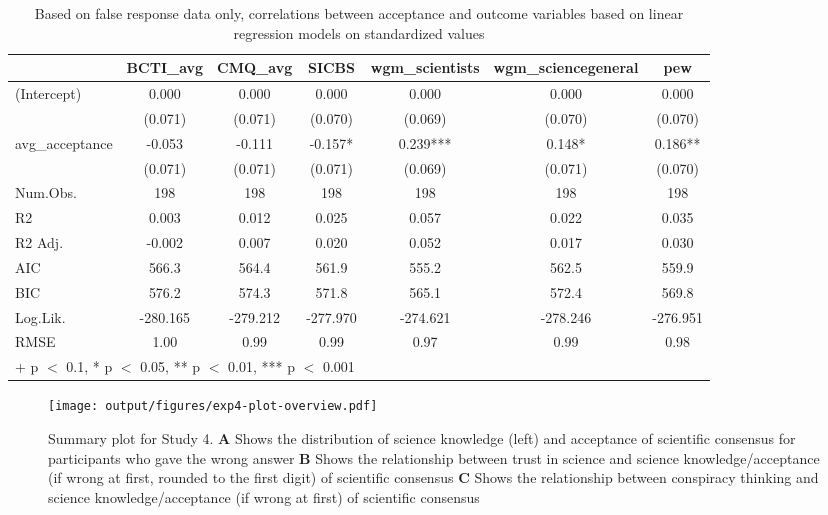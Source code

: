 \documentclass[
  doc,floatsintext]{apa6}
\begin{document}
\begin{table}

\caption{\label{tab:exp4-false-response-regression}Based on false response data only, correlations between acceptance and outcome variables based on linear regression models on standardized values}
\centering
\begin{tabular}[t]{lcccccc}
\toprule
  & BCTI\_avg & CMQ\_avg & SICBS & wgm\_scientists & wgm\_sciencegeneral & pew\\
\midrule
(Intercept) & 0.000 & 0.000 & 0.000 & 0.000 & 0.000 & 0.000\\
 & (0.071) & (0.071) & (0.070) & (0.069) & (0.070) & (0.070)\\
avg\_acceptance & -0.053 & -0.111 & -0.157* & 0.239*** & 0.148* & 0.186**\\
 & (0.071) & (0.071) & (0.071) & (0.069) & (0.071) & (0.070)\\
\midrule
Num.Obs. & 198 & 198 & 198 & 198 & 198 & 198\\
R2 & 0.003 & 0.012 & 0.025 & 0.057 & 0.022 & 0.035\\
R2 Adj. & -0.002 & 0.007 & 0.020 & 0.052 & 0.017 & 0.030\\
AIC & 566.3 & 564.4 & 561.9 & 555.2 & 562.5 & 559.9\\
BIC & 576.2 & 574.3 & 571.8 & 565.1 & 572.4 & 569.8\\
Log.Lik. & -280.165 & -279.212 & -277.970 & -274.621 & -278.246 & -276.951\\
RMSE & 1.00 & 0.99 & 0.99 & 0.97 & 0.99 & 0.98\\
\bottomrule
\multicolumn{7}{l}{\rule{0pt}{1em}+ p $<$ 0.1, * p $<$ 0.05, ** p $<$ 0.01, *** p $<$ 0.001}\\
\end{tabular}
\end{table}



\begin{figure}
\centering
\texttt{[image: output/figures/exp4-plot-overview.pdf]}
\caption{\label{fig:exp4-plot-overview}Summary plot for Study 4. \textbf{A} Shows the distribution of science knowledge (left) and acceptance of scientific consensus for participants who gave the wrong answer \textbf{B} Shows the relationship between trust in science and science knowledge/acceptance (if wrong at first, rounded to the first digit) of scientific consensus \textbf{C} Shows the relationship between conspiracy thinking and science knowledge/acceptance (if wrong at first) of scientific consensus}
\end{figure}
\end{document}
